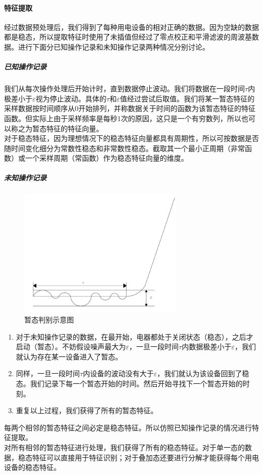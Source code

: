 \documentclass[UTF8]{article}
\begin{document}
\paragraph{特征提取}
\indent 经过数据预处理后，我们得到了每种用电设备的相对正确的数据。因为空缺的数据都是稳态，所以提取特征时使用了未插值但经过了零点校正和平滑滤波的周波基数据。进行下面分已知操作记录和未知操作记录两种情况分别讨论。
\subparagraph{已知操作记录}
\indent 我们从每次操作处理后开始计时，直到数据停止波动。我们将数据在一段时间\(\tau\)内极差小于\(\varepsilon\)视为停止波动。具体的\(\tau\)和\(\varepsilon\)值经过尝试后取值。我们将某一暂态特征的采样数据按时间顺序从0开始排列，并称数据关于时间的函数为该暂态特征的特征函数。但实际上由于采样频率是每秒1次的原因，这只是一个有穷数列，所以也可以称之为暂态特征的特征向量。\\
\indent 对于稳态特征，因为理想情况下的稳态特征向量都具有周期性，所以可按数据是否随时间变化细分为常数性稳态和非常数性稳态。截取其一个最小正周期（非常函数）或一个采样周期（常函数）作为稳态特征向量的维度。

\subparagraph{未知操作记录}
\begin{figure}[htbp]
\small
\centering
\includegraphics[width=8cm]{idea.png}
\caption{暂态判别示意图}
\end{figure}
\begin{enumerate}[1]
\item 对于未知操作记录的数据，在最开始，电器都处于关闭状态（稳态），之后才启动（暂态）。不妨假设噪声最大为\(\varepsilon\)，一旦一段时间\(\tau\)内数据极差小于\(\varepsilon\)，我们就认为存在某一设备进入了暂态。
\item 同样，一旦一段时间\(\tau\)内设备的波动没有大于\(\varepsilon\)，我们就认为该设备回到了稳态。我们记录下每一个暂态开始的时间。然后开始寻找下一个暂态开始的时刻。
\item 重复以上过程，我们获得了所有的暂态特征。
\end{enumerate}

每两个相邻的暂态特征之间必定是稳态特征。所以仿照已知操作记录的情况进行特征提取。\\
\indent 对所有相邻的暂态特征进行处理，我们获得了所有的稳态特征。对于单一态的数据，稳态特征可以直接用于特征识别；对于叠加态还要进行分解才能获得每个用电设备的稳态特征。
\end{document}
